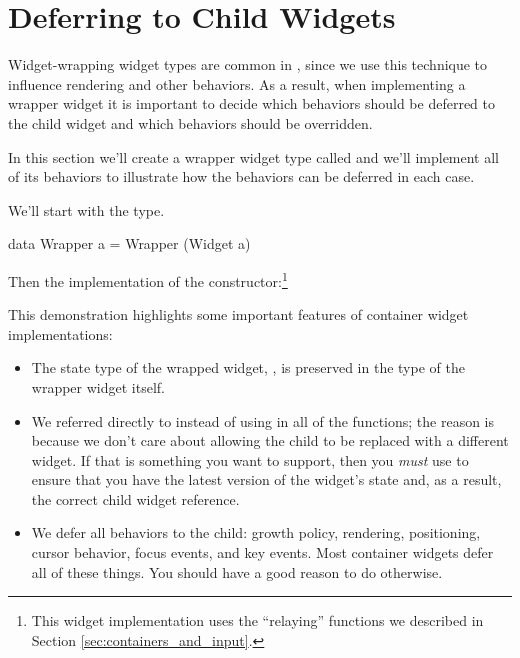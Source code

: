 \section{Deferring to Child Widgets}
\label{sec:deferring}

Widget-wrapping widget types are common in \vtyui, since we use this
technique to influence rendering and other behaviors.  As a result,
when implementing a wrapper widget it is important to decide which
behaviors should be deferred to the child widget and which behaviors
should be overridden.

In this section we'll create a wrapper widget type called 
and we'll implement all of its behaviors to illustrate how the
behaviors can be deferred in each case.

We'll start with the type.

\begin{haskellcode}
 data Wrapper a = Wrapper (Widget a)
\end{haskellcode}

Then the implementation of the constructor:\footnote{This widget
  implementation uses the ``relaying'' functions we described in
  Section \ref{sec:containers_and_input}.}


This demonstration highlights some important features of container
widget implementations:

\begin{itemize}
\item The state type of the wrapped widget, , is preserved in
  the type of the wrapper widget itself.
\item We referred directly to  instead of using
   in all of the functions; the reason is because we
  don't care about allowing the child to be replaced with a different
  widget.  If that is something you want to support, then you
  \textit{must} use  to ensure that you have the latest
  version of the widget's state and, as a result, the correct child
  widget reference.
\item We defer all behaviors to the child: growth policy, rendering,
  positioning, cursor behavior, focus events, and key events.  Most
  container widgets defer all of these things.  You should have a good
  reason to do otherwise.
\end{itemize}

